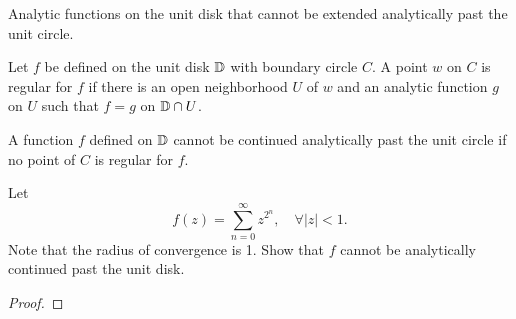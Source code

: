 \documentclass[../hw2]{subfiles}
\begin{document}
\begin{problem}
Analytic functions on the unit disk that cannot be extended analytically past the unit circle.
\begin{definition}[regular]
	Let $f$ be defined on the unit disk  $\mathbb{D}$ with boundary circle $C$.
	A point $w$ on $C$ is regular for $f$ if there is an open neighborhood $U$ of $w$
	and an analytic function $g$ on $U$ such that $f=g$ on $\mathbb{D}\cap U$.
\end{definition}
\begin{lemma}
	A function $f$ defined on $\mathbb{D}$ cannot be continued analytically past the unit circle if no point of $C$ is regular for $f$.
\end{lemma}
Let  \[
	f(z)=\sum_{n=0}^{\infty} z^{2^{n}}, \quad \forall |z|<1
	.\]
Note that the radius of convergence is 1.
Show that $f$ cannot be analytically continued past the unit disk.
\end{problem}
\begin{proof}

\end{proof}
\end{document}
